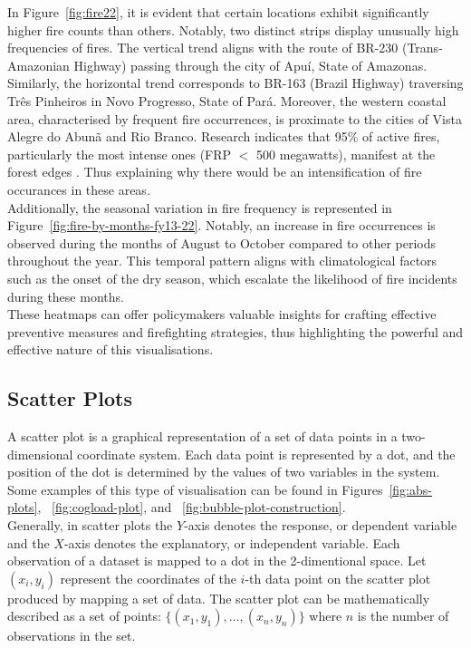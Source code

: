 \documentclass{article}\usepackage[]{graphicx}\usepackage[]{xcolor}
\numberwithin{equation}{section}
\begin{document}
\noindent
In Figure~\ref{fig:fire22}, it is evident that certain locations exhibit significantly higher fire counts than others. Notably, two distinct strips display unusually high frequencies of fires. The vertical trend aligns with the route of BR-230 (Trans-Amazonian Highway) passing through the city of Apuí, State of Amazonas. Similarly, the horizontal trend corresponds to BR-163 (Brazil Highway) traversing Três Pinheiros in Novo Progresso, State of Pará. Moreover, the western coastal area, characterised by frequent fire occurrences, is proximate to the cities of Vista Alegre do Abunã and Rio Branco. Research indicates that 95\% of active fires, particularly the most intense ones (FRP $<$ 500 megawatts), manifest at the forest edges \cite{forest}. Thus explaining why there would be an intensification of fire occurances in these areas.\\ 

\noindent
Additionally, the seasonal variation in fire frequency is represented in Figure~\ref{fig:fire-by-months-fy13-22}. Notably, an increase in fire occurrences is observed during the months of August to October compared to other periods throughout the year. This temporal pattern aligns with climatological factors such as the onset of the dry season, which escalate the likelihood of fire incidents during these months.\\

\noindent 
These heatmaps can offer policymakers valuable insights for crafting effective preventive measures and firefighting strategies, thus highlighting the powerful and effective nature of this visualisations.

\subsection{Scatter Plots}

A scatter plot is a graphical representation of a set of data points in a two-dimensional coordinate system. Each data point is represented by a dot, and the position of the dot is determined by the values of two variables in the system. Some examples of this type of visualisation can be found in Figures~\ref{fig:abs-plots}, ~\ref{fig:cogload-plot}, and ~\ref{fig:bubble-plot-construction}.\\

\noindent
Generally, in scatter plots the \(Y\)-axis denotes the response, or dependent variable and the \(X\)-axis denotes the explanatory, or independent variable. Each observation of a dataset is mapped to a dot in the 2-dimentional space. Let \((x_i, y_i)\) represent the coordinates of the \(i\)-th data point on the scatter plot produced by mapping a set of data. The scatter plot can be mathematically described as a set of points: \( \{(x_1, y_1), \ldots, (x_n, y_n)\}\) where \(n\) is the number of observations in the set.
\end{document}
